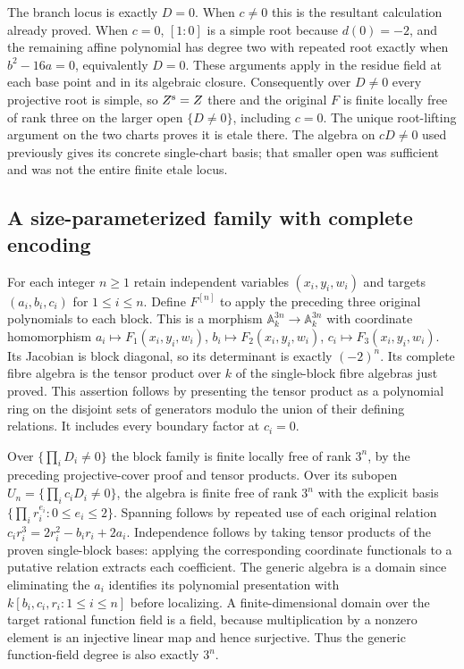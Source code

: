 The branch locus is exactly $D=0$. When $c\ne0$ this is the
resultant calculation already proved. When $c=0$, $[1:0]$ is a simple
root because $d(0)=-2$, and the remaining affine polynomial has degree
two with repeated root exactly when $b^2-16a=0$, equivalently $D=0$.
These arguments apply in the residue field at each base point and in
its algebraic closure. Consequently over $D\ne0$ every projective
root is simple, so $Z^{\rm s}=Z$ there and the original $F$ is finite
locally free of rank three on the larger open $\{D\ne0\}$, including
$c=0$. The unique root-lifting argument on the two charts proves it is
etale there. The algebra on $cD\ne0$ used previously gives its concrete
single-chart basis; that smaller open was sufficient and was not the
entire finite etale locus.

\subsection{A size-parameterized family with complete encoding}

For each integer $n\ge1$ retain independent variables
$(x_i,y_i,w_i)$ and targets $(a_i,b_i,c_i)$ for $1\le i\le n$.
Define $F^{[n]}$ to apply the preceding three original polynomials to
each block. This is a morphism $\mathbb A_k^{3n}\to\mathbb A_k^{3n}$
with coordinate homomorphism $a_i\mapsto F_1(x_i,y_i,w_i)$,
$b_i\mapsto F_2(x_i,y_i,w_i)$, $c_i\mapsto F_3(x_i,y_i,w_i)$.
Its Jacobian is block diagonal, so its determinant is exactly $(-2)^n$.
Its complete fibre algebra is the tensor product over $k$ of the
single-block fibre algebras just proved. This assertion follows by
presenting the tensor product as a polynomial ring on the disjoint sets
of generators modulo the union of their defining relations. It includes
every boundary factor at $c_i=0$.

Over $\{\prod_i D_i\ne0\}$ the block family is finite locally free
of rank $3^n$, by the preceding projective-cover proof and tensor products.
Over its subopen $U_n=\{\prod_i c_iD_i\ne0\}$, the algebra is finite free of
rank $3^n$ with the explicit basis
$\{\prod_i r_i^{e_i}:0\le e_i\le2\}$. Spanning follows by repeated
use of each original relation
$c_ir_i^3=2r_i^2-b_ir_i+2a_i$. Independence follows by taking tensor
products of the proven single-block bases: applying the corresponding
coordinate functionals to a putative relation extracts each coefficient.
The generic algebra is a domain since eliminating the $a_i$ identifies
its polynomial presentation with $k[b_i,c_i,r_i:1\le i\le n]$ before
localizing. A finite-dimensional domain over the target rational
function field is a field, because multiplication by a nonzero element
is an injective linear map and hence surjective. Thus the generic
function-field degree is also exactly $3^n$.

